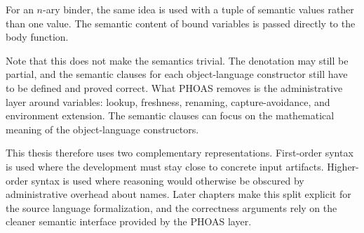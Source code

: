 For an \(n\)-ary binder, the same idea is used with a tuple of semantic values rather than one value.
The semantic content of bound variables is passed directly to the body function.

Note that this does not make the semantics trivial.
The denotation may still be partial, and the semantic clauses for each object-language constructor still have to be defined and proved correct.
What PHOAS removes is the administrative layer around variables: lookup, freshness, renaming, capture-avoidance, and environment extension.
The semantic clauses can focus on the mathematical meaning of the object-language constructors.

This thesis therefore uses two complementary representations.
First-order syntax is used where the development must stay close to concrete input artifacts.
Higher-order syntax is used where reasoning would otherwise be obscured by administrative overhead about names.
Later chapters make this split explicit for the source language formalization, and the correctness arguments rely on the cleaner semantic interface provided by the PHOAS layer.
